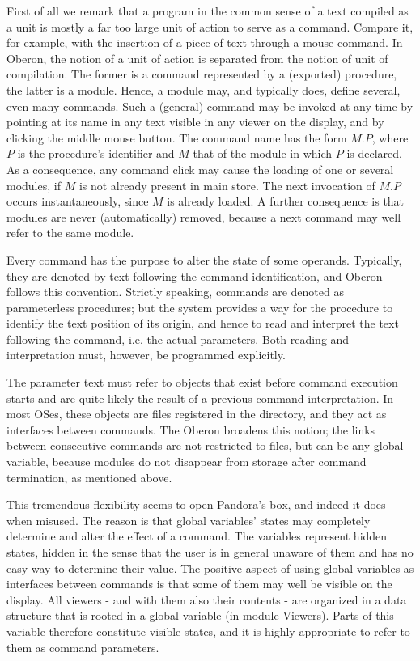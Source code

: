 First of all we remark that a program in the common sense of a text compiled as a unit is mostly a
far too large unit of action to serve as a command. Compare it, for example, with the insertion of a
piece of text through a mouse command. In Oberon, the notion of a unit of action is separated from
the notion of unit of compilation. The former is a command represented by a (exported) procedure,
the latter is a module. Hence, a module may, and typically does, define several, even many
commands. Such a (general) command may be invoked at any time by pointing at its name in any
text visible in any viewer on the display, and by clicking the middle mouse button. The command
name has the form $M.P$, where $P$ is the procedure's identifier and $M$ that of the module in which $P$ is
declared. As a consequence, any command click may cause the loading of one or several modules,
if $M$ is not already present in main store. The next invocation of $M.P$ occurs instantaneously, since
$M$ is already loaded. A further consequence is that modules are never (automatically) removed,
because a next command may well refer to the same module.

Every command has the purpose to alter the state of some operands. Typically, they are denoted
by text following the command identification, and Oberon follows this convention. Strictly speaking,
commands are denoted as parameterless procedures; but the system provides a way for the
procedure to identify the text position of its origin, and hence to read and interpret the text following
the command, i.e. the actual parameters. Both reading and interpretation must, however, be
programmed explicitly.

The parameter text must refer to objects that exist before command execution starts and are quite
likely the result of a previous command interpretation. In most OSes, these objects are
files registered in the directory, and they act as interfaces between commands. The Oberon
broadens this notion; the links between consecutive commands are not restricted to files, but can
be any global variable, because modules do not disappear from storage after command
termination, as mentioned above.

This tremendous flexibility seems to open Pandora's box, and indeed it does when misused. The
reason is that global variables' states may completely determine and alter the effect of a command.
The variables represent hidden states, hidden in the sense that the user is in general unaware of
them and has no easy way to determine their value. The positive aspect of using global variables
as interfaces between commands is that some of them may well be visible on the display. All
viewers - and with them also their contents - are organized in a data structure that is rooted in a
global variable (in module Viewers). Parts of this variable therefore constitute visible states, and it is
highly appropriate to refer to them as command parameters.

